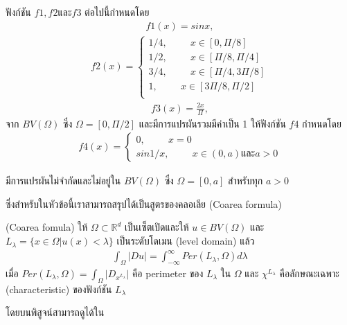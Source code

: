 \begin{Example}
    ฟังก์ชัน $f1, f2 \text{และ} f3 $ ต่อไปนี้กำหนดโดย
    \begin{align}
        f1(x) = sin x,
    \end{align}
    \begin{align}
        f2(x) = \left\{
            \begin{array}{ll}
              1/4, \hspace{1cm}  x \in [0,\Pi/8] \\
              1/2, \hspace{1cm}  x \in [\Pi/8,\Pi/4] \\
              3/4, \hspace{1cm}  x \in [\Pi/4,3\Pi/8] \\
              1, \hspace{1cm}  x \in [3\Pi/8,\Pi/2] \\
            \end{array}
          \right.
    \end{align}
    \begin{align}
        f3(x) = \frac{2x}{\Pi},
    \end{align}
    จาก $BV(\Omega)$ ซึ่ง $\Omega = [0, \Pi/2]$ และมีการแปรผันรวมมีค่าเป็น 1 ให้ฟังก์ชัน $f4$ กำหนดโดย
    \begin{align}
        f4(x) = \left\{ 
            \begin{array}{ll}
                0, \hspace{1cm}  x = 0 \\
                sin 1/x, \hspace{1cm} x \in (0,a) \text{และ} a > 0
            \end{array}
        \right.
    \end{align}
    
    มีการแปรผันไม่จำกัดและไม่อยู่ใน $BV(\Omega)$ ซึ่ง $\Omega = [0,a]$ สำหรับทุก $a > 0$
    
\end{Example}

ซึ่งสำหรับในหัวข้อนี้เราสามารถสรุปได้เป็นสูตรของคลอเลีย (Coarea formula)

\begin{Theorem} (Coarea fomula) ให้ $\Omega \subset \mathbb{R}^d$ เป็นเซ็ตเปิดและให้ $ u \in BV(\Omega)$ และ $L_{\lambda} = \{ x \in \Omega | u(x) < \lambda \}$ เป็นระดับโดเมน (level domain) แล้ว
    \begin{align*}
        \int_{\Omega} | D u | = \int_{- \infty}^{\infty} Per(L_{\lambda}, \Omega) d \lambda
    \end{align*}
    เมื่อ $Per(L_{\lambda}, \Omega) = \int_{\Omega} |D_{x^{L_{\lambda}}}|$ คือ perimeter ของ $L_{\lambda}$ ใน $\Omega$ และ $\chi^{L_{\lambda}}$ คือลักษณะเฉพาะ (characteristic) ของฟังก์ชัน $L_{\lambda}$

    โดยบนพิสูจน์สามารถดูได้ใน \cite{ref:bounded_variation} 
\end{Theorem}